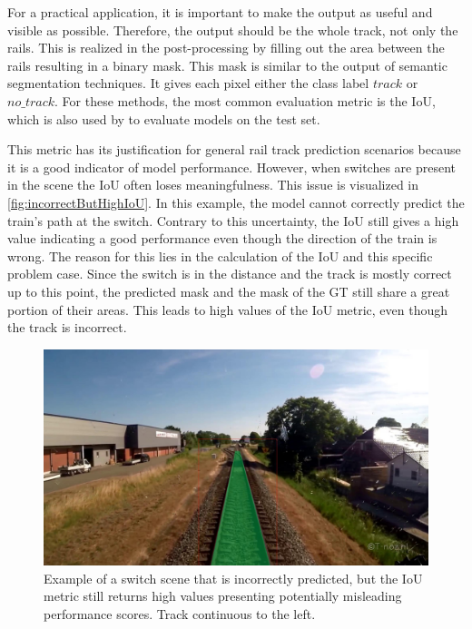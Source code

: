 For a practical application, it is important to make the output as useful and visible as possible.
Therefore, the output should be the whole track, not only the rails.
This is realized in the post-processing by filling out the area between the rails resulting in a binary mask.
This mask is similar to the output of semantic segmentation techniques.
It gives each pixel either the class label $track$ or $no\_track$.
For these methods, the most common evaluation metric is the \ac{IoU}, which is also used by \cite{tepNet2024} to evaluate models on the test set.

This metric has its justification for general rail track prediction scenarios because it is a good indicator of model performance.
However, when switches are present in the scene the \ac{IoU} often loses meaningfulness.
This issue is visualized in \autoref{fig:incorrectButHighIoU}.
In this example, the model cannot correctly predict the train's path at the switch.
Contrary to this uncertainty, the \ac{IoU} still gives a high value indicating a good performance even though the direction of the train is wrong.
The reason for this lies in the calculation of the \ac{IoU} and this specific problem case.
Since the switch is in the distance and the track is mostly correct up to this point, the predicted mask and the mask of the \ac{GT} still share a great portion of their areas.
This leads to high values of the \ac{IoU} metric, even though the track is incorrect.

\begin{figure} [H]
    \centering
    \includegraphics[width=0.7\linewidth]{PICs//usedDatasets/falsch_aber_hohe_IoU.jpg}
    \caption{Example of a switch scene that is incorrectly predicted, but the \ac{IoU} metric still returns high values presenting potentially misleading performance scores. Track continuous to the left.}
    \label{fig:incorrectButHighIoU}
\end{figure}

